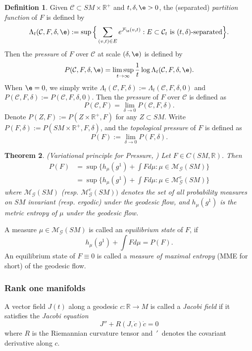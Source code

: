 \documentclass[11pt]{amsart}
\newtheorem{theorem}{Theorem}[section]
\theoremstyle{definition}
\newtheorem{definition}[theorem]{Definition}
\def\M{{\mathcal M}}
\newcommand{\F}{\mathcal{F}}
\def\CG{{\mathcal G}}
\def\RR{{\mathbb R}}
\def\d{\delta}   %
\begin{document}
\begin{definition}
Given $\mathcal{C}\subset SM\times \mathbb{R}^+$ and $t,\delta,\e>0$, the (separated)\textit{ partition function} of $F$ is defined by
$$
\Lambda_t(\mathcal{C},F,\delta,\e):=\sup\Big\{\sum_{(v,t)\in E}e^{\F_{\e}(v,t)}: E\subset \mathcal{C}_t \text{ is } (t,\d)\text{-separated}\Big\}.
$$
Then the \textit{pressure} of $F$ over $\mathcal{C}$ at scale $(\delta,\e)$ is defined by
$$
P(\mathcal{C},F,\delta,\e)=\limsup_{t\to \infty}\frac{1}{t}\log \Lambda_t(\mathcal{C},F,\delta,\e).
$$
When $\e=0$, we simply write $\Lambda_t(\mathcal{C},F,\delta):=\Lambda_t(\mathcal{C},F,\delta, 0)$ and $P(\mathcal{C},F,\delta):=P(\mathcal{C},F,\delta,0)$. Then the \textit{pressure} of $F$ over $\mathcal{C}$ is defined as 
$$P(\mathcal{C},F)=\lim_{\delta\to 0}P(\mathcal{C}, F,\delta).$$ 
Denote $P(Z, F):=P(Z\times \RR^+, F)$ for any $Z\subset SM$. Write $P(F,\delta):=P(SM\times \mathbb{R}^+,F,\delta)$, and the \textit{topological pressure} of $F$ is defined as  
$$P(F):=\lim_{\delta\to 0}P(F,\delta).$$
\end{definition}

\begin{theorem}(Variational principle for Pressure, \cite[Theorem 4.3.7]{FH})
Let $F \in C(SM,\RR)$. Then
\begin{equation*}
\begin{aligned}
P(F)&=\sup\Big\{h_{\mu}(g^1)+\int F d{\mu}: \mu\in \mathcal{M}_{\CG}(SM)\Big\}\\
&=\sup\Big\{h_{\mu}(g^1)+\int F d{\mu}: \mu\in \mathcal{M}_{\CG}^e(SM)\Big\}
\end{aligned}
\end{equation*}
where $\mathcal{M}_{\CG}(SM)$ (resp. $\mathcal{M}_{\CG}^e(SM))$ denotes the set of all probability measures on $SM$ invariant (resp. ergodic) under the geodesic flow, and $h_{\mu}(g^1)$ is the metric entropy of $\mu$ under the geodesic flow.
\end{theorem}
A measure $\mu\in \M_{\CG}(SM)$ is called an \emph{equilibrium state} of $F$, if
\begin{equation*}
  h_{\mu}(g^1)+\int F d\mu=P(F).
\end{equation*}
An equilibrium state of $F\equiv 0$ is called a \emph{measure of maximal entropy} (MME for short) of the geodesic flow.

\subsubsection{Rank one manifolds}
A vector field $J(t)$ along a geodesic $c:\RR\to M$ is called a \emph{Jacobi field} if it satisfies the \emph{Jacobi equation} 
$$J''+R(J, \dot c)\dot c=0$$
where $R$ is the Riemannian curvature tensor and\ $'$\ denotes the covariant derivative along $c$.
\end{document}

